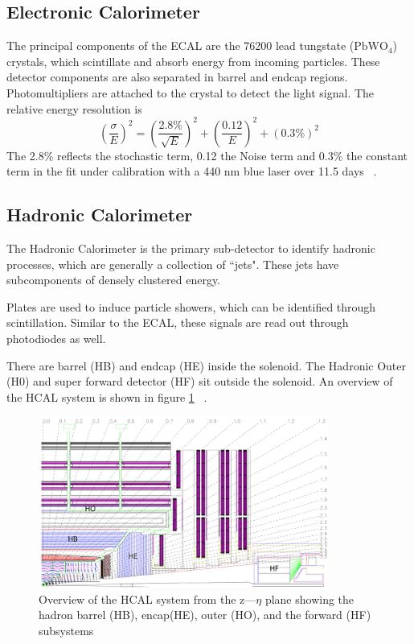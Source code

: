 \subsection{Electronic Calorimeter}

The principal components of the ECAL are the 76200 lead tungstate ($\text{PbWO}_4$) crystals, which scintillate and absorb energy from incoming particles. These detector components are also separated in barrel and endcap regions. Photomultipliers are attached to the crystal to detect the light signal. The relative energy resolution is 
\begin{equation*}
\label{eq:ecal}
\left(\frac{\sigma}{E}\right)^2 = \left( \frac{2.8\%}{\sqrt{E}}  \right)^2 + \left( \frac{0.12}{E}  \right)^2 + (0.3\%)^2 
\end{equation*}
The 2.8\% reflects the stochastic term, 0.12 the Noise term and 0.3\% the constant term in the fit under calibration with a 440 nm blue laser over 11.5 days ~\cite{Chatrchyan:2008zzk,Eichhorn:2112017}. 

\subsection{Hadronic Calorimeter} 
The Hadronic Calorimeter is the primary sub-detector to identify hadronic processes, which are generally a collection of ``jets". These jets have subcomponents of densely clustered energy. 

Plates are used to induce particle showers, which can be identified through scintillation. Similar to the ECAL, these signals are read out through photodiodes as well. 

There are barrel (HB) and endcap (HE) inside the solenoid. The Hadronic Outer (H0) and super forward detector (HF) sit outside the solenoid. An overview of the HCAL system is shown in figure \ref{fig:hcal} ~\cite{Chatrchyan:2008zzk,Eichhorn:2112017}. 

\begin{figure}[ht!b]
  \centering
\includegraphics[width=0.85\textwidth]{figures/HCAL.png}    
    \caption{\label{fig:hcal} Overview of the HCAL system from the z---$\eta$ plane showing the hadron barrel (HB), encap(HE), outer (HO), and the forward (HF) subsystems ~\cite{Chatrchyan:2008zzk}}
\end{figure}




